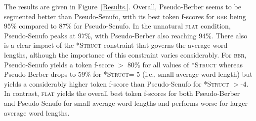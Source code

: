 \documentclass[11pt]{article}
\begin{document}
The results are given in Figure~\ref{Results.}. Overall, Pseudo-Berber seems to be segmented better than Pseudo-Senufo, with its best token f-scores for \textsc{bbr} being 95\% compared to 87\% for Pseudo-Senufo. In the unnatural \textsc{flat} condition, Pseudo-Senufo peaks at 97\%, with Pseudo-Berber also reaching 94\%. There also is a clear impact of the \textsc{*Struct} constraint that governs the average word lengths, although the importance of this constraint varies considerably. For \textsc{bbr}, Pseudo-Senufo yields a token f-score $>$ 80\% for all values of \textsc{*Struct} whereas Pseudo-Berber drops to 59\% for \textsc{*Struct}=-5 (i.e., small average word length) but yields a considerably higher token f-score than Pseudo-Senufo for \textsc{*Struct} $>$-4. In contrast, \textsc{flat} yields the overall best token f-scores for both Pseudo-Berber and Pseudo-Senufo for small average word lengths and performs worse for larger average word lengths.
\end{document}
